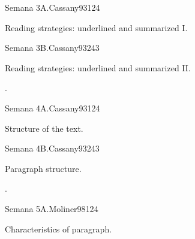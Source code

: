 \begin{syllabus}
\begin{unit}{Semana 3A.}{}{Cassany93}{12}{4}
   \begin{topics}
      \item Reading strategies: underlined and summarized I.
   \end{topics}
   \begin{learningoutcomes}
      \item 
   \end{learningoutcomes}
\end{unit}

\begin{unit}{Semana 3B.}{}{Cassany93}{24}{3}
   \begin{topics}
      \item Reading strategies: underlined and summarized II.
   \end{topics}

   \begin{learningoutcomes}
      \item .
      \end{learningoutcomes}
\end{unit}

\begin{unit}{Semana 4A.}{}{Cassany93}{12}{4}
   \begin{topics}
      \item Structure of the text.
   \end{topics}
   \begin{learningoutcomes}
      \item 
   \end{learningoutcomes}
\end{unit}

\begin{unit}{Semana 4B.}{}{Cassany93}{24}{3}
   \begin{topics}
      \item Paragraph structure.
   \end{topics}

   \begin{learningoutcomes}
      \item .
      \end{learningoutcomes}
\end{unit}

\begin{unit}{Semana 5A.}{}{Moliner98}{12}{4}
   \begin{topics}
      \item Characteristics of paragraph.
   \end{topics}
   \begin{learningoutcomes}
      \item 
   \end{learningoutcomes}
\end{unit}


\end{syllabus}

